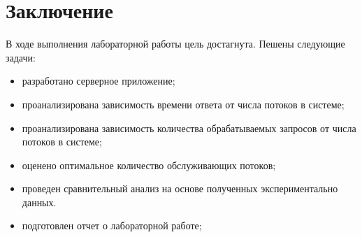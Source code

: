 \chapter*{Заключение}


В ходе выполнения лабораторной работы цель достагнута. Пешены следующие задачи:

\begin{itemize}
	\item разработано серверное приложение;
	\item проанализирована зависимость времени ответа от числа потоков в системе;
	\item проанализирована зависимость количества обрабатываемых запросов от числа потоков в системе;
	\item оценено оптимальное количество обслуживающих потоков;
	\item проведен сравнительный анализ на основе полученных экспериментально данных.
	\item подготовлен отчет о лабораторной работе;
\end{itemize}
